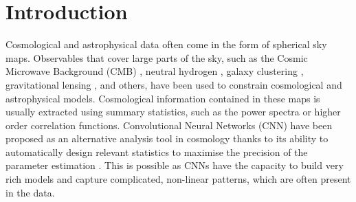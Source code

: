 \documentclass[final,twocolumn,3p,times,authoryear]{elsarticle}
\newcommand{\TK}[1]{{\color{red}{TK:#1}}}
\newcommand{\1}{\b{1}}              %
\newcommand{\0}{\b{0}}              %
\begin{document}
\section{Introduction}
\label{sec:intro}


Cosmological and astrophysical data often come in the form of spherical sky maps.
Observables that cover large parts of the sky, such as the Cosmic Microwave Background (CMB) \citep{planck2015cosmologicalparameters,komatsu2011sevenyear,staggs2018recentdiscoveries}, neutral hydrogen \citep{santos2015cosmologySKA,HI4PI2016fullskyHI}, galaxy clustering \citep{alam2017clusteringgalaxies}, gravitational lensing \citep{troxel2017darkenergy,hildebrandt2017kidscosmological}, and others, have been used to constrain cosmological and astrophysical models.
Cosmological information contained in these maps is usually extracted using summary statistics, such as the power spectra or higher order correlation functions.
Convolutional Neural Networks (CNN) have been proposed as an alternative analysis tool in cosmology thanks to its ability to automatically design relevant statistics to maximise the precision of the parameter estimation
\citep{schmelze2017cosmologicalmodel,luciesmith2018machinelearning,gupta2018nongaussianinformation,gillet2018deeplearning,hassan2018reionizationmodels,aragoncalvo2018classyfyinglarge,ciuca2017cnnstring,ravanbakhsh2017estimating}.
This is possible as CNNs have the capacity to build very rich models and capture complicated, non-linear patterns, which are often present in the data.

\end{document}
